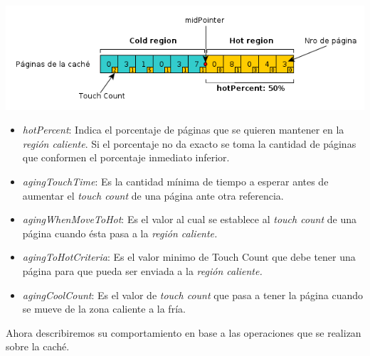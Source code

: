 \documentclass[11pt, a4paper, spanish]{article}
\begin{document}
\begin{center}
	\includegraphics[scale=0.65]{diagramas/TouchCountAlgorithm1.png}\\
\end{center}

\begin{itemize}
	\item{\emph{hotPercent}: Indica el porcentaje de p\'aginas que se quieren mantener en la \textit{regi\'on caliente}. Si el porcentaje no
da exacto se toma la cantidad de p\'aginas que conformen el porcentaje inmediato inferior. }
	\item{\emph{agingTouchTime}: Es la cantidad m\'inima de tiempo a esperar antes de aumentar el \textit{touch count}  de una p\'agina ante otra referencia.}
	\item{\emph{agingWhenMoveToHot}: Es el valor al cual se establece al \textit{touch count} de una p\'agina cuando \'esta pasa a la \textit{regi\'on caliente.} }
	\item{\emph{agingToHotCriteria}: Es el valor minimo de Touch Count que debe tener una p\'agina para que pueda ser enviada a la \textit{regi\'on caliente.}}
	\item{\emph{agingCoolCount}: Es el valor de \textit{touch count} que pasa a tener la p\'agina cuando se mueve de la zona caliente a la fr\'ia.}
\end{itemize}

Ahora describiremos su comportamiento en base a las operaciones que se realizan sobre la cach\'e.
\end{document}
